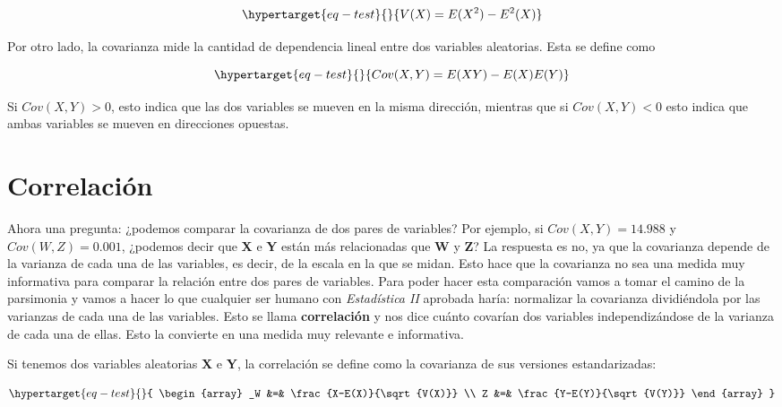 \documentclass[
  letterpaper,
  DIV=11,
  numbers=noendperiod,
  oneside]{scrreprt}
\begin{document}
\begin{equation}\protect\hypertarget{eq-test}{}{
V(X) = E(X^2) - E^2(X)
}\label{eq-test}\end{equation}

Por otro lado, la covarianza mide la cantidad de dependencia lineal
entre dos variables aleatorias. Esta se define como

\begin{equation}\protect\hypertarget{eq-test}{}{
Cov(X,Y) = E(XY) - E(X)E(Y)
}\label{eq-test}\end{equation}

Si \(Cov(X,Y)>0\), esto indica que las dos variables se mueven en la
misma dirección, mientras que si \(Cov(X,Y)<0\) esto indica que ambas
variables se mueven en direcciones opuestas.

\hypertarget{correlaciuxf3n}{%
\section{Correlación}\label{correlaciuxf3n}}

Ahora una pregunta: ¿podemos comparar la covarianza de dos pares de
variables? Por ejemplo, si \(Cov(X, Y) = 14.988\) y
\(Cov(W, Z) = 0.001\), ¿podemos decir que \textbf{X} e \textbf{Y} están
más relacionadas que \textbf{W} y \textbf{Z}? La respuesta es no, ya que
la covarianza depende de la varianza de cada una de las variables, es
decir, de la escala en la que se midan. Esto hace que la covarianza no
sea una medida muy informativa para comparar la relación entre dos pares
de variables. Para poder hacer esta comparación vamos a tomar el camino
de la parsimonia y vamos a hacer lo que cualquier ser humano con
\emph{Estadística II} aprobada haría: normalizar la covarianza
dividiéndola por las varianzas de cada una de las variables. Esto se
llama \textbf{correlación} y nos dice cuánto covarían dos variables
independizándose de la varianza de cada una de ellas. Esto la convierte
en una medida muy relevante e informativa.

Si tenemos dos variables aleatorias \textbf{X} e \textbf{Y}, la
correlación se define como la covarianza de sus versiones
estandarizadas:

\begin{equation}\protect\hypertarget{eq-test}{}{
\begin{array}
_W &=& \frac{X-E(X)}{\sqrt{V(X)}} \\
Z &=& \frac{Y-E(Y)}{\sqrt{V(Y)}}
\end{array}
}\label{eq-test}\end{equation}
\end{document}
